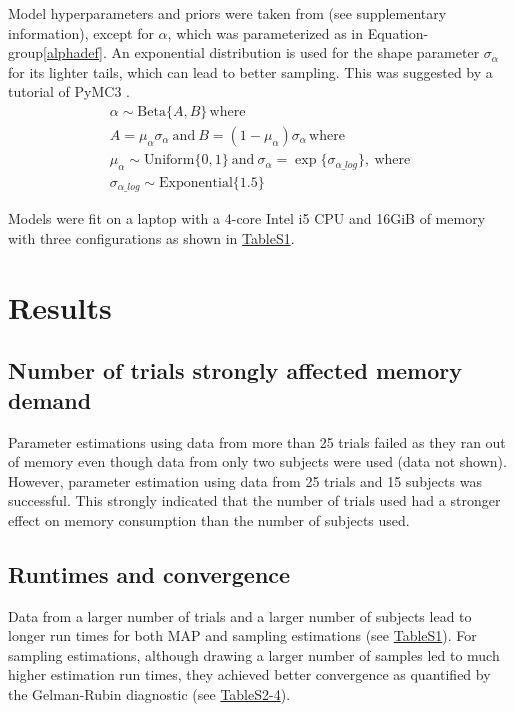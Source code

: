 \documentclass[10pt,a4paper]{article}
\begin{document}
Model hyperparameters and priors were taken from \cite{Otto2013} (see supplementary information), except for $\alpha$, which was parameterized as in Equation-group\ref{alphadef}. An exponential distribution is used for the shape parameter $\sigma_{\alpha}$ for its lighter tails, which can lead to better sampling. This was suggested by a tutorial of PyMC3 \citep{website:hpp}.
\begin{subequations} 
  \label{alphadef}
  \begin{gather}
    \alpha \sim \text{Beta}\{A, B\}\, \text{where}\\
A=\mu_{\alpha}\sigma_{\alpha}\ \text{and}\ B=(1-\mu_{\alpha})\sigma_{\alpha}\, \text{where}\\
\mu_{\alpha}\sim \text{Uniform}\{0, 1\}\ \text{and}\ \sigma_{\alpha}=\exp\{\sigma_{\alpha\_log}\},\ \text{where}\\
\sigma_{\alpha\_log}\sim\text{Exponential}\{1.5\}
\end{gather}
\end{subequations}

Models were fit on a laptop with a 4-core Intel i5 CPU and 16GiB of memory with three configurations as shown in \hyperref[Tables]{TableS1}.

\section*{Results}
\subsection*{Number of trials strongly affected memory demand}
Parameter estimations using data from more than 25 trials failed as they ran out of memory even though data from only two subjects were used (data not shown). However, parameter estimation using data from 25 trials and 15 subjects was successful. This strongly indicated that the number of trials used had a stronger effect on memory consumption than the number of subjects used.


\subsection*{Runtimes and convergence}
Data from a larger number of trials and a larger number of subjects lead to longer run times for both MAP and sampling estimations (see \hyperref[Tables]{TableS1}). For sampling estimations, although drawing a larger number of samples led to much higher estimation run times, they achieved better convergence as quantified by the Gelman-Rubin diagnostic (see \hyperref[Tables]{TableS2-4}).
\end{document}
